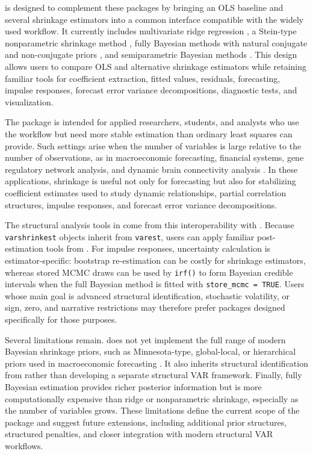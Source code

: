  is designed to complement these packages by bringing
an OLS baseline and several shrinkage estimators into a common interface
compatible with the widely used  workflow. It currently
includes multivariate ridge regression \citep{Hoerl70, Golub79}, a Stein-type
nonparametric shrinkage method \citep{Rhein07c}, fully Bayesian methods with
natural conjugate and non-conjugate priors \citep{Ni05}, and semiparametric
Bayesian methods \citep{LeeChoiKim2016}. This design allows users to compare
OLS and alternative shrinkage estimators while retaining familiar tools for
coefficient extraction, fitted values, residuals, forecasting, impulse
responses, forecast error variance decompositions, diagnostic tests, and
visualization.

The package is intended for applied researchers, students, and analysts
who use the  workflow but need more stable estimation than
ordinary least squares can provide. Such settings arise when the number
of variables is large relative to the number of observations, as in
macroeconomic forecasting, financial systems, gene regulatory network
analysis, and dynamic brain connectivity analysis
\citep{Harrison03, Rhein07c, Banbura10}. In these applications, shrinkage is
useful not only for forecasting but also for stabilizing coefficient
estimates used to study dynamic relationships, partial correlation
structures, impulse responses, and forecast error variance
decompositions.

The structural analysis tools in  come from this
interoperability with . Because \texttt{varshrinkest} objects
inherit from \texttt{varest}, users can apply familiar post-estimation tools
from . For impulse responses, uncertainty calculation is
estimator-specific: bootstrap re-estimation can be costly for shrinkage
estimators, whereas stored MCMC draws can be used by \texttt{irf()} to form
Bayesian credible intervals when the full Bayesian method is fitted with
\texttt{store\_mcmc\ =\ TRUE}.
Users whose main goal is advanced structural identification, stochastic
volatility, or sign, zero, and narrative restrictions may therefore
prefer packages designed specifically for those purposes.

Several limitations remain.  does not yet implement
the full range of modern Bayesian shrinkage priors, such as
Minnesota-type, global-local, or hierarchical priors used in
macroeconomic forecasting \citep{Doan84, Litterman86, KastnerHuber2017, Giannone2015prior}.
It also inherits structural identification from  rather
than developing a separate structural VAR framework. Finally, fully
Bayesian estimation provides richer posterior information but is more
computationally expensive than ridge or nonparametric shrinkage,
especially as the number of variables grows. These limitations define
the current scope of the package and suggest future extensions, including
additional prior structures, structured penalties, and closer integration
with modern structural VAR workflows.

